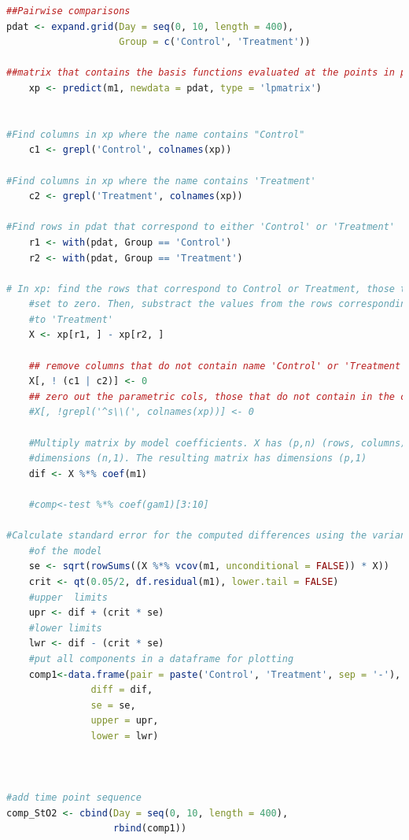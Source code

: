 \documentclass[
]{article}
\begin{document}
\begin{lstlisting}[language=R]
##Pairwise comparisons
pdat <- expand.grid(Day = seq(0, 10, length = 400),
                    Group = c('Control', 'Treatment'))

##matrix that contains the basis functions evaluated at the points in pdat
    xp <- predict(m1, newdata = pdat, type = 'lpmatrix')

    
#Find columns in xp where the name contains "Control"
    c1 <- grepl('Control', colnames(xp))

#Find columns in xp where the name contains 'Treatment'
    c2 <- grepl('Treatment', colnames(xp))

#Find rows in pdat that correspond to either 'Control' or 'Treatment'
    r1 <- with(pdat, Group == 'Control')
    r2 <- with(pdat, Group == 'Treatment')

# In xp: find the rows that correspond to Control or Treatment, those that do not match will be
    #set to zero. Then, substract the values from the rows corresponding to 'Control' from those that correspond
    #to 'Treatment'
    X <- xp[r1, ] - xp[r2, ]

    ## remove columns that do not contain name 'Control' or 'Treatment'
    X[, ! (c1 | c2)] <- 0
    ## zero out the parametric cols, those that do not contain in the characters 's('
    #X[, !grepl('^s\\(', colnames(xp))] <- 0

    #Multiply matrix by model coefficients. X has (p,n) (rows, columns) and the coefficient matrix has
    #dimensions (n,1). The resulting matrix has dimensions (p,1)
    dif <- X %*% coef(m1)

    #comp<-test %*% coef(gam1)[3:10]

#Calculate standard error for the computed differences using the variance-covariance matrix
    #of the model
    se <- sqrt(rowSums((X %*% vcov(m1, unconditional = FALSE)) * X))
    crit <- qt(0.05/2, df.residual(m1), lower.tail = FALSE)
    #upper  limits
    upr <- dif + (crit * se)
    #lower limits
    lwr <- dif - (crit * se)
    #put all components in a dataframe for plotting
    comp1<-data.frame(pair = paste('Control', 'Treatment', sep = '-'),
               diff = dif,
               se = se,
               upper = upr,
               lower = lwr)



#add time point sequence
comp_StO2 <- cbind(Day = seq(0, 10, length = 400),
                   rbind(comp1))


\end{lstlisting}
\end{document}
